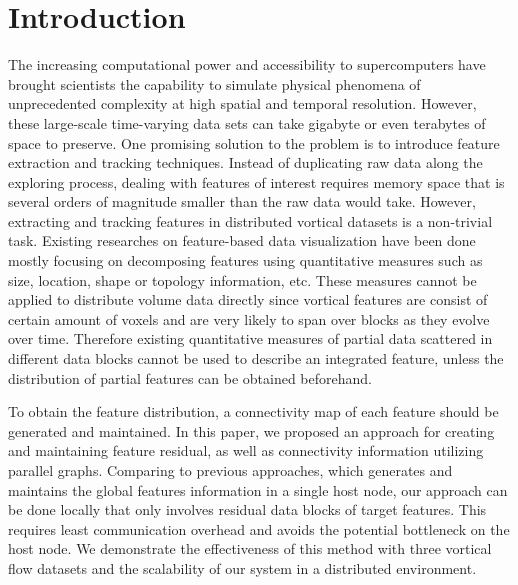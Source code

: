 \documentclass[10pt, conference, compsocconf]{IEEEtran}
\begin{document}
%
\IEEEpeerreviewmaketitle

\section{Introduction}
The increasing computational power and accessibility to supercomputers have brought scientists the capability to simulate physical phenomena of unprecedented complexity at high spatial and temporal resolution. However, these large-scale time-varying data sets can take gigabyte or even terabytes of space to preserve. One promising solution to the problem is to introduce feature extraction and tracking techniques. Instead of duplicating raw data along the exploring process, dealing with features of interest requires memory space that is several orders of magnitude smaller than the raw data would take.
However, extracting and tracking features in distributed vortical datasets is a non-trivial task. Existing researches on feature-based data visualization have been done mostly focusing on decomposing features using quantitative measures such as size, location, shape or topology information, etc. These measures cannot be applied to distribute volume data directly since vortical features are consist of certain amount of voxels and are very likely to span over blocks as they evolve over time. Therefore existing quantitative measures of partial data scattered in different data blocks cannot be used to describe an integrated feature, unless the distribution of partial features can be obtained beforehand. 

To obtain the feature distribution, a connectivity map of each feature should be generated and maintained. In this paper, we proposed an approach for creating and maintaining feature residual, as well as connectivity information utilizing parallel graphs. Comparing to previous approaches, which generates and maintains the global features information in a single host node, our approach can be done locally that only involves residual data blocks of target features. This requires least communication overhead and avoids the potential bottleneck on the host node. We demonstrate the effectiveness of this method with three vortical flow datasets and the scalability of our system in a distributed environment.
\end{document}
